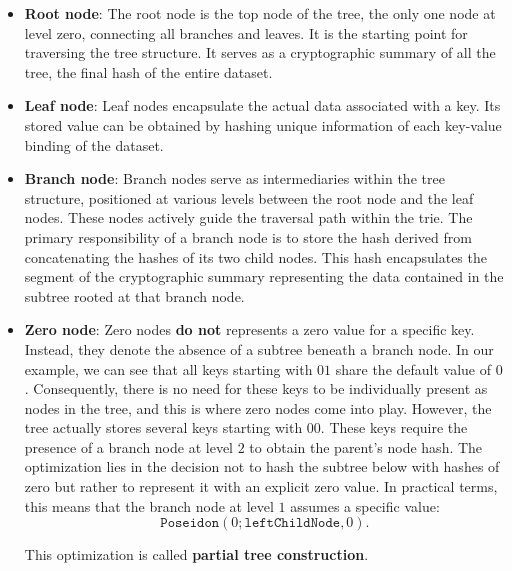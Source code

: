 \begin{itemize}

\item \textbf{Root node}: The root node is the top node of the tree, the only one node at level zero, connecting all branches and leaves. It is the starting point for traversing the tree structure. It serves as a cryptographic summary of all the tree, the final hash of the entire dataset.

\item \textbf{Leaf node}: Leaf nodes encapsulate the actual data associated with a key. Its stored value can be obtained by hashing unique information of each key-value binding of the dataset.

\item \textbf{Branch node}: Branch nodes serve as intermediaries within the tree structure, positioned at various levels between the root node and the leaf nodes. These nodes actively guide the traversal path within the trie. The primary responsibility of a branch node is to store the hash derived from concatenating the hashes of its two child nodes. This hash encapsulates the segment of the cryptographic summary representing the data contained in the subtree rooted at that branch node.

\item \textbf{Zero node}: Zero nodes \textbf{do not} represents a zero value for a specific key. Instead, they denote the absence of a subtree beneath a branch node. In our example, we can see that all keys starting with $01$ share the default value of $0$. Consequently, there is no need for these keys to be individually present as nodes in the tree, and this is where zero nodes come into play. However, the tree actually stores several keys starting with $00$. These keys require the presence of a branch node at level $2$ to obtain the parent's node hash. The optimization lies in the decision not to hash the subtree below with hashes of zero but rather to represent it with an explicit zero value. In practical terms, this means that the branch node at level $1$ assumes a specific value:
\[
\texttt{Poseidon}(0; \texttt{leftChildNode}, 0).
\]

This optimization is called \textbf{partial tree construction}.

\end{itemize}

